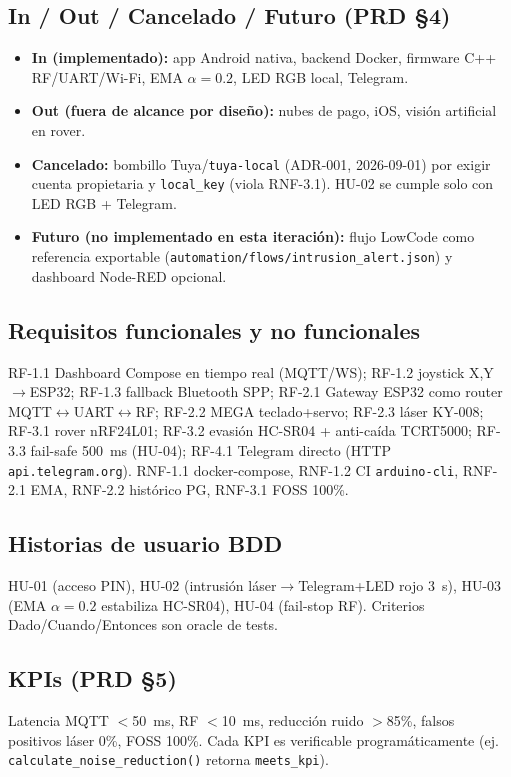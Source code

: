 \documentclass[conference]{IEEEtran}
\begin{document}
\subsection{In / Out / Cancelado / Futuro (PRD \S4)}
\begin{itemize}
\item \textbf{In (implementado):} app Android nativa, backend Docker, firmware C++ RF/UART/Wi-Fi, EMA $\alpha=0.2$, LED RGB local, Telegram.
\item \textbf{Out (fuera de alcance por diseño):} nubes de pago, iOS, visión artificial en rover.
\item \textbf{Cancelado:} bombillo Tuya/\texttt{tuya-local} (ADR-001, 2026-09-01) por exigir cuenta propietaria y \texttt{local\_key} (viola RNF-3.1). HU-02 se cumple solo con LED RGB + Telegram.
\item \textbf{Futuro (no implementado en esta iteración):} flujo LowCode como referencia exportable (\texttt{automation/flows/intrusion\_alert.json}) y dashboard Node-RED opcional.
\end{itemize}

\subsection{Requisitos funcionales y no funcionales}
RF-1.1 Dashboard Compose en tiempo real (MQTT/WS); RF-1.2 joystick X,Y$\rightarrow$ESP32; RF-1.3 fallback Bluetooth SPP; RF-2.1 Gateway ESP32 como router MQTT$\leftrightarrow$UART$\leftrightarrow$RF; RF-2.2 MEGA teclado+servo; RF-2.3 láser KY-008; RF-3.1 rover nRF24L01; RF-3.2 evasión HC-SR04 + anti-caída TCRT5000; RF-3.3 fail-safe 500~ms (HU-04); RF-4.1 Telegram directo (HTTP \texttt{api.telegram.org}). RNF-1.1 docker-compose, RNF-1.2 CI \texttt{arduino-cli}, RNF-2.1 EMA, RNF-2.2 histórico PG, RNF-3.1 FOSS 100\%.

\subsection{Historias de usuario BDD}
HU-01 (acceso PIN), HU-02 (intrusión láser$\rightarrow$Telegram+LED rojo 3~s), HU-03 (EMA $\alpha=0.2$ estabiliza HC-SR04), HU-04 (fail-stop RF). Criterios Dado/Cuando/Entonces son oracle de tests.

\subsection{KPIs (PRD \S5)}
Latencia MQTT $<$50~ms, RF $<$10~ms, reducción ruido $>$85\%, falsos positivos láser 0\%, FOSS 100\%. Cada KPI es verificable programáticamente (ej. \texttt{calculate\_noise\_reduction()} retorna \texttt{meets\_kpi}).
\end{document}
